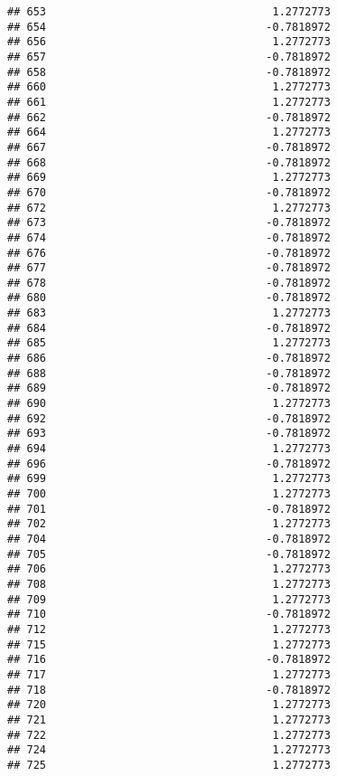 \documentclass[
]{article}
\begin{document}
\begin{verbatim}
## 653                                   1.2772773
## 654                                  -0.7818972
## 656                                   1.2772773
## 657                                  -0.7818972
## 658                                  -0.7818972
## 660                                   1.2772773
## 661                                   1.2772773
## 662                                  -0.7818972
## 664                                   1.2772773
## 667                                  -0.7818972
## 668                                  -0.7818972
## 669                                   1.2772773
## 670                                  -0.7818972
## 672                                   1.2772773
## 673                                  -0.7818972
## 674                                  -0.7818972
## 676                                  -0.7818972
## 677                                  -0.7818972
## 678                                  -0.7818972
## 680                                  -0.7818972
## 683                                   1.2772773
## 684                                  -0.7818972
## 685                                   1.2772773
## 686                                  -0.7818972
## 688                                  -0.7818972
## 689                                  -0.7818972
## 690                                   1.2772773
## 692                                  -0.7818972
## 693                                  -0.7818972
## 694                                   1.2772773
## 696                                  -0.7818972
## 699                                   1.2772773
## 700                                   1.2772773
## 701                                  -0.7818972
## 702                                   1.2772773
## 704                                  -0.7818972
## 705                                  -0.7818972
## 706                                   1.2772773
## 708                                   1.2772773
## 709                                   1.2772773
## 710                                  -0.7818972
## 712                                   1.2772773
## 715                                   1.2772773
## 716                                  -0.7818972
## 717                                   1.2772773
## 718                                  -0.7818972
## 720                                   1.2772773
## 721                                   1.2772773
## 722                                   1.2772773
## 724                                   1.2772773
## 725                                   1.2772773

\end{verbatim}
\end{document}
